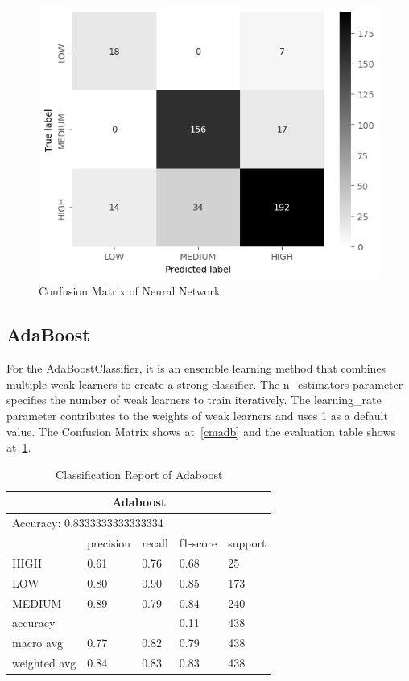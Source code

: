 \begin{figure}[H]
    \includegraphics[scale=0.7]{imgs/nn_cm}
    \centering
    \caption{Confusion Matrix of Neural Network}
    \label{cmNN}
\end{figure}

\subsection{AdaBoost}

For the AdaBoostClassifier, it is an ensemble learning method that combines multiple weak learners to create a strong classifier. The n\_estimators parameter specifies the number of weak learners to train iteratively. The learning\_rate parameter contributes to the weights of weak learners and uses 1 as a default value.
The Confusion Matrix shows at~\ref*{cmadb} and the evaluation table shows at~\ref*{tableADB}.

\begin{table}[H]\centering
    \begin{tabular}{@{}lllll@{}}
    \toprule
    \multicolumn{5}{c}{Adaboost}                 \\ \midrule
    \multicolumn{5}{l}{Accuracy:  0.8333333333333334}       \\\midrule
                 & precision & recall & f1-score & support \\
    HIGH         & 0.61      & 0.76   & 0.68     & 25      \\ 
    LOW          & 0.80      & 0.90   & 0.85     & 173     \\
    MEDIUM       & 0.89      & 0.79   & 0.84     & 240     \\
    accuracy     &           &        & 0.11     & 438     \\
    macro avg    & 0.77      & 0.82   & 0.79     & 438     \\
    weighted avg & 0.84      & 0.83   & 0.83     & 438     \\ \bottomrule
    \end{tabular}
    \caption{Classification Report of Adaboost}
    \label{tableADB}
    \end{table}

